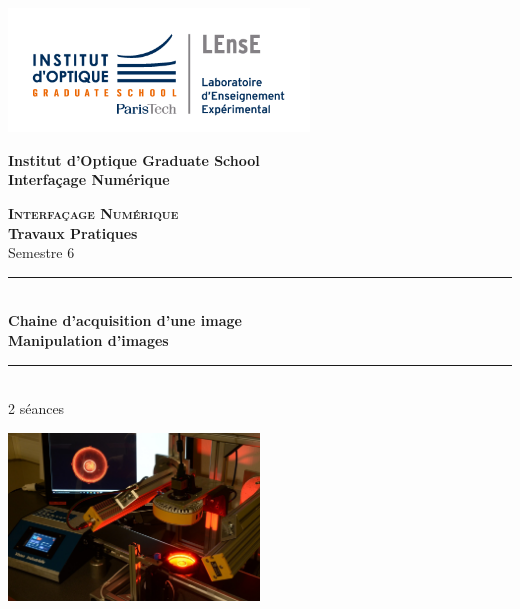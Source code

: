 \documentclass[a4paper,11pt,titlepage]{article} %
\begin{document}
\begin{titlepage}

\begin{center}
	\begin{minipage}{2.5cm}
	\begin{center}
		\includegraphics[width=8cm]{images/Logo-LEnsE.png}
	\end{center}
\end{minipage}\hfill
\begin{minipage}{10cm}
	\begin{center}
	\textbf{Institut d'Optique Graduate School }\\[0.1cm]
    \textbf{Interfaçage Numérique}


	\end{center}
\end{minipage}\hfill


\vspace{4cm}


{\huge \bfseries \textsc{Interfaçage Numérique}} \\[0.5cm]
{\large \bfseries Travaux Pratiques} \\[0.2cm]
Semestre 6

\vspace{1.2cm}
\rule{\linewidth}{0.3mm} \\[0.4cm]
{ \huge \bfseries\color{violet_iogs} Chaine d'acquisition d'une image \\ Manipulation d'images\\[0.4cm] }
\rule{\linewidth}{0.3mm} \\[0.8cm]

2 séances

\bigskip

\begin{center}
	\includegraphics[width=0.5\textwidth]{images/camera_vi.jpg}
\end{center}


\end{center}
\end{titlepage}
\end{document}
